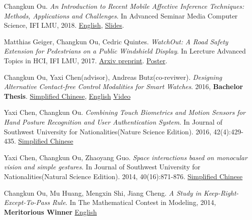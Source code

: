     \item{
        Changkun Ou.
        \emph{An Introduction to Recent Mobile Affective Inference Techniques: Methods, Applications and Challenges}.
        In Advanced Seminar Media Computer Science, IFI LMU, 2018. 
        \href{https://github.com/changkun/research/blob/master/papers/ou2018hs-paper.pdf}{English}, 
        \href{hhttps://github.com/changkun/research/blob/master/papers/ou2018hs-slides.pdf}{Slides}.
    }
    \item{
        Matthias Geiger, Changkun Ou, Cedric Quintes.
        \emph{WatchOut: A Road Safety Extension for Pedestrians on a Public Windshield Display}.
        In Lercture Advanced Topics in HCI, IFI LMU, 2017. 
        \href{https://arxiv.org/abs/1905.05390}{Arxiv preprint}. 
        \href{https://github.com/changkun/research/blob/master/papers/ou2017ath-poster.pdf}{Poster}.
    }
    \item{
        Changkun Ou, Yaxi Chen(advisor), Andreas Butz(co-reviwer).
        \emph{Designing Alternative Contact-free Control Modalities for Smart Watches}. 
        2016, \textbf{Bachelor Thesis}. \href{https://github.com/changkun/research/blob/master/papers/ou2016bachelor-cn.pdf}{Simplified Chinese}, 
        \href{https://github.com/changkun/research/blob/master/papers/ou2016bachelor-en.pdf}{English} \href{https://www.youtube.com/watch?v=C2-5z7pIv98}{Video}
    }
    \item{
        Yaxi Chen, Changkun Ou. 
        \emph{Combining Touch Biometrics and Motion Sensors for Hand Posture Recognition and User Authentication System}. 
        In Journal of Southwest University for Nationalities(Nature Science Edition). 
        2016, 42(4):429-435. \href{https://blog.changkun.de/files/cv/touch.swun.html}{Simplified Chinese}
    }
    \item{
        Yaxi Chen, Changkun Ou, Zhaoyang Guo.
        \emph{Space interactions based on monocular vision and simple gestures}. 
        In Journal of Southwest University for Nationalities(Natural Science Edition). 
        2014, 40(16):871-876. \href{https://blog.changkun.de/files/cv/vision.swun.html}{Simplified Chinese}
    }
    \item{
        Changkun Ou, Mu Huang, Mengxin Shi, Jiang Cheng. 
        \emph{A Study in Keep-Right-Except-To-Pass Rule}. 
        In The Mathematical Contest in Modeling, 2014, \textbf{Meritorious Winner} \href{https://github.com/changkun/research/blob/master/papers/ou2014car-paper.pdf}{English}
    }
 \resumeSubHeadingListEnd